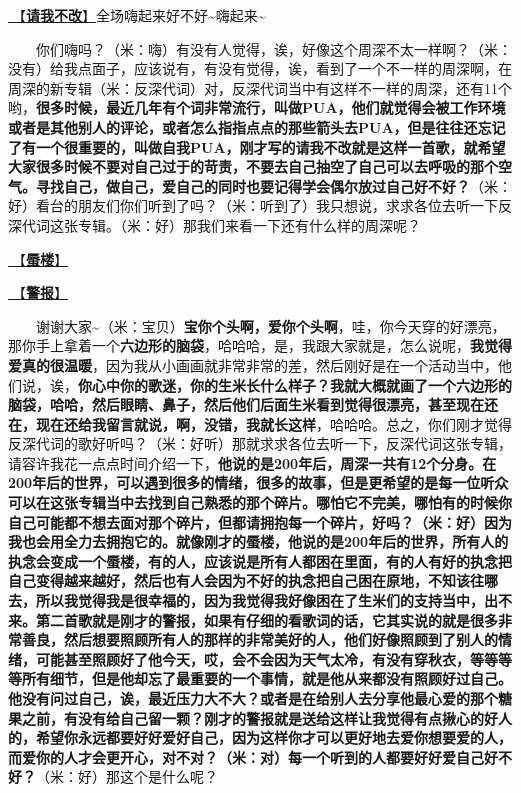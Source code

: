 \documentclass[]{ctexbook}
\begin{document}
\hyperref[brave-heart]{🎵【\textbf{请我不改}】}全场嗨起来好不好\textasciitilde 嗨起来\textasciitilde{}

  你们嗨吗？（米：嗨）有没有人觉得，诶，好像这个周深不太一样啊？（米：没有）给我点面子，应该说有，有没有觉得，诶，看到了一个不一样的周深啊，在周深的新专辑（米：反深代词）对，反深代词当中有这样不一样的周深，还有11个哟，\textbf{很多时候，最近几年有个词非常流行，叫做PUA，他们就觉得会被工作环境或者是其他别人的评论，或者怎么指指点点的那些箭头去PUA，但是往往还忘记了有一个很重要的，叫做自我PUA，刚才写的请我不改就是这样一首歌，就希望大家很多时候不要对自己过于的苛责，不要去自己抽空了自己可以去呼吸的那个空气。寻找自己，做自己，爱自己的同时也要记得学会偶尔放过自己好不好？}（米：好）看台的朋友们你们听到了吗？（米：听到了）我只想说，求求各位去听一下反深代词这张专辑。（米：好）那我们来看一下还有什么样的周深呢？

\hyperref[mirage]{🎵【\textbf{蜃楼}】}

\hyperref[the-giver]{🎵【\textbf{警报}】}

  谢谢大家\textasciitilde（米：宝贝）\textbf{宝你个头啊，爱你个头啊}，哇，你今天穿的好漂亮，那你手上拿着一个\textbf{六边形的脑袋}，哈哈哈，是，我跟大家就是，怎么说呢，\textbf{我觉得爱真的很温暖}，因为我从小画画就非常非常的差，然后刚好是在一个活动当中，他们说，诶，\textbf{你心中你的歌迷，你的生米长什么样子？我就大概就画了一个六边形的脑袋，哈哈，然后眼睛、鼻子，然后他们后面生米看到觉得很漂亮，甚至现在还在，现在还给我留言就说，啊，没错，我就长这样}，哈哈哈。总之，你们刚才觉得反深代词的歌好听吗？（米：好听）那就求求各位去听一下，反深代词这张专辑，请容许我花一点点时间介绍一下，\textbf{他说的是200年后，周深一共有12个分身。在200年后的世界，可以遇到很多的情绪，很多的故事，但是更希望的是每一位听众可以在这张专辑当中去找到自己熟悉的那个碎片。哪怕它不完美，哪怕有的时候你自己可能都不想去面对那个碎片，但都请拥抱每一个碎片，好吗？（米：好）因为我也会用全力去拥抱它的。就像刚才的蜃楼，他说的是200年后的世界，所有人的执念会变成一个蜃楼，有的人，应该说是所有人都困在里面，有的人有好的执念把自己变得越来越好，然后也有人会因为不好的执念把自己困在原地，不知该往哪去，所以我觉得我是很幸福的，因为我觉得我好像困在了生米们的支持当中，出不来。第二首歌就是刚才的警报，如果有仔细的看歌词的话，它其实说的就是很多非常善良，然后想要照顾所有人的那样的非常美好的人，他们好像照顾到了别人的情绪，可能甚至照顾好了他今天，哎，会不会因为天气太冷，有没有穿秋衣，等等等等所有细节，但是他却忘了最重要的一个事情，就是他从来都没有照顾好过自己。他没有问过自己，诶，最近压力大不大？或者是在给别人去分享他最心爱的那个糖果之前，有没有给自己留一颗？刚才的警报就是送给这样让我觉得有点揪心的好人的，希望你永远都要好好爱好自己，因为这样你才可以更好地去爱你想要爱的人，而爱你的人才会更开心，对不对？（米：对）每一个听到的人都要好好爱自己好不好？}（米：好）那这个是什么呢？
\end{document}
